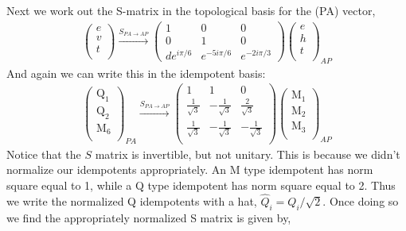 \documentclass[12pt,a4paper]{article}
\newcounter{arrow}
\begin{document}
Next we work out the S-matrix in the topological basis for the  (PA) vector,
\begin{align}
\left( \begin{matrix}
e \\ 
v\\ 
t\\ 
\end{matrix} \right)
  \xrightarrow{S_{PA \rightarrow AP}}
\left( \begin{matrix}
1&0&0\\
0&1&0\\
de^{i \pi/6} & e^{-5 i \pi /6} & e^{-2 i \pi /3}
\end{matrix} \right)
\left( \begin{matrix}
e \\
h\\ 
t\\ 
\end{matrix} \right)_{AP} 
\end{align}
And again we can write this in the idempotent basis:
\begin{align}
\left( \begin{matrix}
\text{Q}_1\\
\text{Q}_2\\
\text{M}_6\\
\end{matrix} \right)_{PA}
\xrightarrow{S_{PA \rightarrow AP}}
\left( \begin{matrix}
1& 1& 0 \\
\frac{1}{\sqrt{3}} & - \frac{1}{\sqrt{3}} & \frac{2}{\sqrt{3}} \\
\frac{1}{\sqrt{3}} & - \frac{1}{\sqrt{3}} & - \frac{1}{\sqrt{3}} \\
\end{matrix} \right)
\left( \begin{matrix}
\text{M}_1\\
\text{M}_2\\
\text{M}_3\\
\end{matrix} \right)_{AP}
\end{align}
Notice that the $S$ matrix is invertible, but not unitary. 
This is because we didn't normalize our idempotents appropriately. 
An M type idempotent has norm square equal to 1, while a Q type idempotent has norm square equal to 2.
Thus we write the normalized Q idempotents with a hat, $\widehat{Q}_i = Q_i /\sqrt{2}$.
Once doing so we find the appropriately normalized S matrix is given by,
\end{document}
